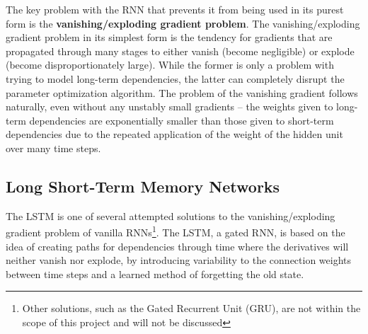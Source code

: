 \documentclass[12pt,a4paper,twoside,openright]{report}
\begin{document}
The key problem with the RNN that prevents it from being used in its purest form is the
\textbf{vanishing/exploding gradient problem}. The vanishing/exploding gradient problem
in its simplest form is the tendency for gradients that are propagated through many stages
to either vanish (become negligible) or explode (become disproportionately large). While the
former is only a problem with trying to model long-term dependencies, the latter can completely
disrupt the parameter optimization algorithm. The problem of the vanishing gradient follows naturally,
even without any unstably small gradients -- the weights given to long-term dependencies are
exponentially smaller than those given to short-term dependencies due to the repeated application
of the weight of the hidden unit over many time steps.

\subsection{Long Short-Term Memory Networks}
\label{sec:introLSTM}

The LSTM is one of several attempted solutions to the vanishing/exploding
gradient problem of vanilla RNNs\footnote{Other solutions, such as the Gated Recurrent Unit (GRU), are
not within the scope of this project and will not be discussed}\cite{Hochreiter97, Gers99}. The LSTM, a gated RNN, is based on the
idea of creating paths for dependencies through time where the derivatives will neither vanish
nor explode, by introducing variability to the connection weights between time steps and a learned
method of forgetting the old state. 
\end{document}
